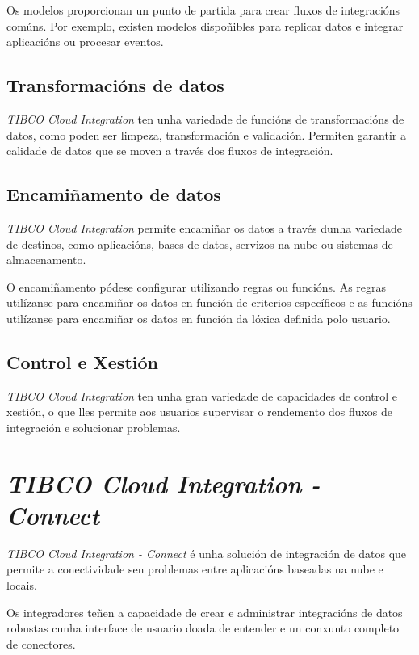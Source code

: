 Os modelos proporcionan un punto de partida para crear fluxos de integracións comúns. Por exemplo, existen modelos dispoñibles para replicar datos e integrar aplicacións ou procesar eventos.

\subsection{Transformacións de datos}

\textit{TIBCO Cloud Integration} ten unha variedade de funcións de transformacións de datos, como poden ser limpeza, transformación e validación. Permiten garantir a calidade de datos que se moven a través dos fluxos de integración.

\subsection{Encamiñamento de datos}

\textit{TIBCO Cloud Integration} permite encamiñar os datos a través dunha variedade de destinos, como aplicacións, bases de datos, servizos na nube ou sistemas de almacenamento.

O encamiñamento pódese configurar utilizando regras ou funcións. As regras utilízanse para encamiñar os datos en función de criterios específicos e as funcións utilízanse para encamiñar os datos en función da lóxica definida polo usuario.

\subsection{Control e Xestión}

\textit{TIBCO Cloud Integration} ten unha gran variedade de capacidades de control e xestión, o que lles permite aos usuarios supervisar o rendemento dos fluxos de integración e solucionar problemas.

\section{\textit{TIBCO Cloud Integration - Connect}}

\textit{TIBCO Cloud Integration - Connect} é  unha solución de integración de datos que permite a conectividade sen problemas entre aplicacións baseadas na nube e locais.

Os integradores teñen a capacidade de crear e administrar integracións de datos robustas cunha interface de usuario doada de entender e un conxunto completo de conectores.

